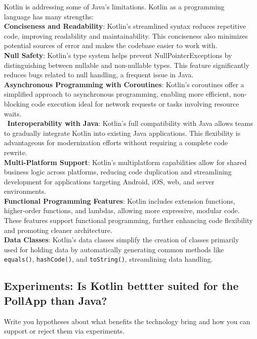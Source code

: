 \vspace{1cm}

Kotlin is addressing some of Java's limitations. Kotlin as a programming language has many strengths:
\\
\textbf{Conciseness and Readability}: Kotlin’s streamlined syntax reduces repetitive code, improving readability and maintainability. This conciseness also minimizes potential sources of error and makes the codebase easier to work with.
\\
\textbf{Null Safety}: Kotlin’s type system helps prevent NullPointerExceptions by distinguishing between nullable and non-nullable types. This feature significantly reduces bugs related to null handling, a frequent issue in Java.
\\
\textbf{Asynchronous Programming with Coroutines}: Kotlin’s coroutines offer a simplified approach to asynchronous programming, enabling more efficient, non-blocking code execution ideal for network requests or tasks involving resource waits.
\\\
\textbf{Interoperability with Java}: Kotlin’s full compatibility with Java allows teams to gradually integrate Kotlin into existing Java applications. This flexibility is advantageous for modernization efforts without requiring a complete code rewrite.
\\
\textbf{Multi-Platform Support}: Kotlin’s multiplatform capabilities allow for shared business logic across platforms, reducing code duplication and streamlining development for applications targeting Android, iOS, web, and server environments.
\\
\textbf{Functional Programming Features}: Kotlin includes extension functions, higher-order functions, and lambdas, allowing more expressive, modular code. These features support functional programming, further enhancing code flexibility and promoting cleaner architecture.
\\
\textbf{Data Classes}: Kotlin’s data classes simplify the creation of classes primarily used for holding data by automatically generating common methods like \texttt{equals()}, \texttt{hashCode()}, and \texttt{toString()}, streamlining data handling.


\subsection{Experiments: Is Kotlin bettter suited for the PollApp than Java? }

Write you hypotheses about what benefits the technology bring and how you can support or reject them via experiments.

